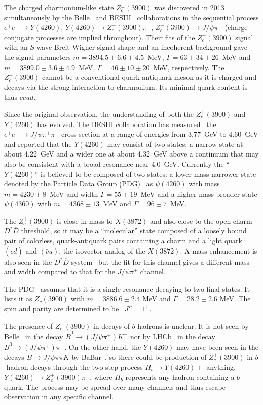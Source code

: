 \documentclass[aps,prd,twocolumn,superscriptaddress,groupedaddress,floatfix]{revtex4}
\begin{document}
The charged charmonium-like state $Z_c^{\pm}(3900)$ was discovered in 2013 simultaneously
by the  Belle~\cite{belle2013} and BESIII~\cite{bes2013}  collaborations in the sequential process 
$e^+e^- \rightarrow  Y(4260)$,  $Y(4260) \rightarrow Z_c^+(3900) \pi^-$, $Z_c^+(3900) \rightarrow J/\psi \pi^+ $
 (charge conjugate processes are
 implied throughout).
Their fits of the $Z_c^+(3900)$ signal with an $S$-wave Breit-Wigner signal shape
and an incoherent background gave the signal parameters
     $m=3894.5\pm6.6\pm4.5$~MeV, $\Gamma=63\pm34\pm26$~MeV
and  $m=3899.0\pm3.6\pm4.9$~MeV, $\Gamma=46\pm10\pm20$~MeV, respectively.
The $Z_c^+(3900)$ cannot be a conventional quark-antiquark meson
as it is charged and  decays via the strong interaction to charmonium. Its minimal quark content
is thus  $c\overline c u \overline d$.

Since the original observation,  the understanding of both the  $Z_c^+(3900)$ and $Y(4260)$  has evolved. 
The BESIII collaboration has measured~\cite{bes3y}  the $e^+e^- \rightarrow J/\psi \pi^+ \pi^-$ 
cross section at a range of energies from 3.77~GeV to 4.60~GeV
and reported that the  $Y(4260)$ may consist of two states: a narrow 
state at about 4.22~GeV and a wider one at about 4.32~GeV above a continuum
that may also be consistent with a broad resonance near 4.0~GeV.   
Currently  the  ``$Y(4260)$'' is believed to be  composed
of two states: a lower-mass  narrower state denoted by the Particle Data Group (PDG)~\cite{pdg}  as 
$\psi(4260)$ 
with  mass  $m=4230\pm8$~MeV and width  $\Gamma=55\pm19$~MeV and a higher-mass broader state 
$\psi(4360)$  with  $m=4368\pm13$~MeV and $\Gamma=96\pm7$~MeV.

The  $Z_c^+(3900)$ is  close in mass to $X(3872)$ and also close to the open-charm 
 $D^* \overline D$ threshold, so it  may be a ``molecular'' state composed of a loosely bound
pair of colorless,   quark-antiquark pairs containing a charm and a light quark $(c\bar d )$ and $(\bar c u)$,
 the isovector  analog of the  $X(3872)$.
A mass enhancement is also seen in the $D^* \overline D$ system~\cite{besdd}
but the fit for this channel gives a different mass and width compared to that for the $J/\psi \pi^+$
 channel.

The PDG~\cite{pdg}  assumes that it is a single   resonance decaying to two final states.
It lists   it as $Z_c(3900)$ with    $m=3886.6\pm2.4$ MeV
and $\Gamma=28.2\pm 2.6$ MeV.
The spin and parity are determined to be~\cite{besjp}  $J^P=1^+$.

The presence of  $Z_c^+(3900)$ in   decays of $b$ hadrons is unclear.
It is not  seen by Belle~\cite{belle2} in the
decay  $\bar B^0 \rightarrow (J/\psi \pi^+) K^-$ nor by LHCb~\cite{lhcbb0} in the decay
 $B^0 \rightarrow (J/\psi \pi^+) \pi^-$.
On the other hand, the $Y(4260)$ may have been seen in the decays
 $B \rightarrow  J/\psi \pi \pi K$ by BaBar~\cite{babar06}, so
  there could  be  production  of $Z_c^+(3900)$  in $b$-hadron  decays
through  the two-step process
 $H_b \rightarrow Y(4260) +$ anything, $Y(4260) \rightarrow Z_c^+(3900) \pi^-$,
 where $H_b$ represents
any hadron containing a $b$ quark.
The process   may be spread over many channels and thus escape
observation in any specific  channel.
\end{document}
